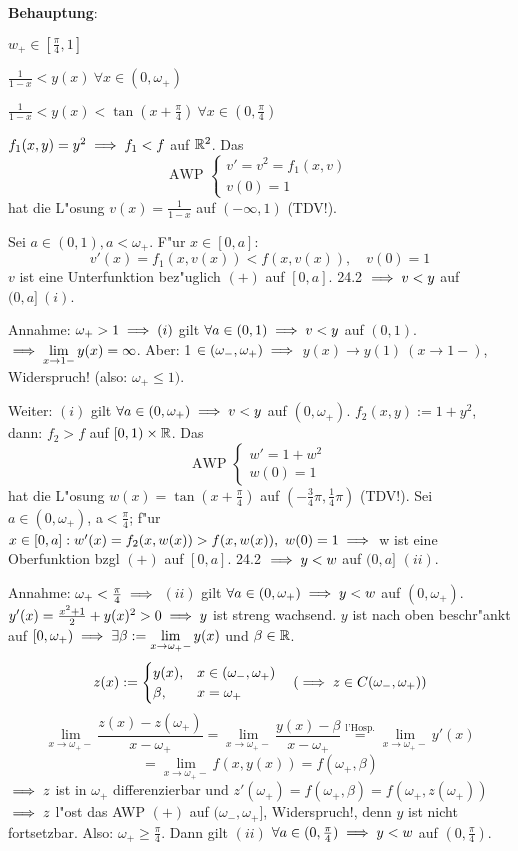 \documentclass{article}
\begin{document}
\textbf{Behauptung}:\begin{liste}
	\item $w_+\in[\frac{\pi}{4},1]$
	\item $\frac{1}{1-x}<y(x)\ \forall x\in(0,\omega_+)$
	\item $\frac{1}{1-x}<y(x)<\tan(x+\frac{\pi}{4})\ \forall x\in(0,\frac{\pi}{4})$
\end{liste}
\begin{beweis}
$f_1(x,y)=y^2\implies f_1<f$ auf $\mathbb{R}^2$. Das
\[
	\text{AWP }\begin{cases}
		v'=v^2=f_1(x,v)\\
		v(0)=1
	\end{cases}
\]
hat die L"osung $v(x)=\frac{1}{1-x}$ auf $(-\infty, 1)$ (TDV!).
\end{beweis}
Sei $a\in (0,1), a<\omega_+$. F"ur $x\in[0,a]$:
\[
	v'(x)=f_1(x, v(x)) < f(x,v(x)),\quad v(0)=1
\]
$v$ ist eine Unterfunktion bez"uglich $(+)$ auf $[0,a]$. 24.2 $\implies v<y$ auf $(0,a]\ (i)$.

Annahme: $\omega_+>1\implies (i)$ gilt $\forall a\in(0,1)\implies v<y$ auf $(0,1)$.
$\implies \displaystyle\lim_{x\to 1-}y(x)=\infty$. Aber: 1 $\in (\omega_-,\omega_+)\implies$
$y(x)\to y(1)\ (x\to 1-)$, Widerspruch! (also: $\omega_+\le 1)$.

Weiter: $(i)$ gilt $\forall a\in (0,\omega_+)\implies v<y$ auf $(0,\omega_+)$. 
$f_2(x,y):=1+y^2$, dann: $f_2>f$ auf $[0,1)\times\mathbb{R}$. Das
\[
	\text{AWP }\begin{cases}
		w'=1+w^2\\
		w(0)=1
	\end{cases}
\]
hat die L"osung $w(x)=\tan(x+\frac{\pi}{4})$ auf $(-\frac{3}{4}\pi,\frac{1}{4}\pi)$ (TDV!).
Sei $a\in (0,\omega_+)$, a$<\frac{\pi}{4}$; f"ur $x\in [0,a]: w'(x)=f_2(x,w(x))>f(x,w(x)),\ 
w(0)=1\folgt$ w ist eine Oberfunktion bzgl $(+)$ auf $[0,a]$. 24.2 $\implies y<w$ auf $(0,a]$ $(ii)$.

Annahme: $\omega_+ < \frac{\pi}{4}\implies$ $(ii)$ gilt $\forall a\in (0,\omega_+)\implies
y<w$ auf $(0,\omega_+)$. $y'(x)=\frac{x^2+1}{2}+y(x)^2>0\implies y$ ist streng wachsend. $y$ ist
nach oben beschr"ankt auf $[0,\omega_+) \implies \exists \beta:=\displaystyle\lim_{x\to\omega_+-}y(x)$ und
$\beta\in\mathbb{R}$.
\[
	z(x):=\begin{cases}
		y(x),& x\in (\omega_-, \omega_+)\\
		\beta,& x=\omega_+
	\end{cases}
	\quad (\implies z\in C(\omega_-,\omega_+))
\]
\[
	\lim_{x\to\omega_+-}\frac{z(x)-z(\omega_+)}{x-\omega_+}=\lim_{x\to\omega_+-}\frac{y(x)-\beta}{x-\omega_+}
	\overset{\text{l'Hosp.}}{=}\lim_{x\to\omega_+-}y'(x)
\]
\[
	= \lim_{x\to\omega_+-}f(x,y(x))=f(\omega_+, \beta)
\]
$\implies z$ ist in $\omega_+$ differenzierbar und $z'(\omega_+)=f(\omega_+,\beta)=f(\omega_+,z(\omega_+))$
$\implies z$ l"ost das AWP $(+)$ auf $(\omega_-,\omega_+]$, Widerspruch!, denn $y$ ist nicht fortsetzbar.
Also: $\omega_+\ge\frac{\pi}{4}$. Dann gilt $(ii)$ $\forall a\in (0,\frac{\pi}{4})\implies y<w$ auf $(0,\frac{\pi}{4})$.
\end{document}
